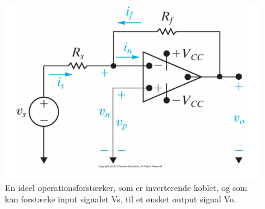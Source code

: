 \begin{figure}[H]
\centering
\includegraphics[scale=0.6]{figures/bProblemanalyse/inverterendeforstaerker.png}
\caption{En ideel operationsforstærker, som er inverterende koblet, og som kan forstærke input signalet Vs, til et ønsket output signal Vo. \cite{Nilsson2011}}
\label{invf}
\end{figure}


